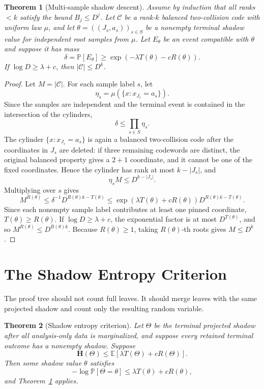 \documentclass[11pt]{article}
\newtheorem{theorem}{Theorem}[section]
\newcommand{\C}{\mathcal C}
\newcommand{\Prb}{\mathbb P}
\newcommand{\EE}{\mathbb E}
\newcommand{\bfH}{\mathbf H}
\begin{document}
\begin{theorem}[Multi-sample shadow descent]
\label{thm:multi-shadow}
Assume by induction that all ranks $<k$ satisfy the bound $B_j\le D^j$.
Let $\C$ be a rank-$k$ balanced two-collision code with uniform law $\mu$, and
let $\theta=((J_s,a_s))_{s\in S}$ be a nonempty terminal shadow value for
independent root samples from $\mu$.  Let $E_\theta$ be an event compatible with
$\theta$ and suppose it has mass
\[
  \delta=\Prb[E_\theta]
  \ge \exp(-\lambda T(\theta)-cR(\theta)).
\]
If $\log D\ge \lambda+c$, then $|\C|\le D^k$.
\end{theorem}

\begin{proof}
Let $M=|\C|$.  For each sample label $s$, let
\[
  \eta_s=\mu(\{x:x_{J_s}=a_s\}).
\]
Since the samples are independent and the terminal event is contained in the
intersection of the cylinders,
\[
  \delta\le \prod_{s\in S}\eta_s.
\]
The cylinder $\{x:x_{J_s}=a_s\}$ is again a balanced two-collision code after
the coordinates in $J_s$ are deleted: if three remaining codewords are
distinct, the original balanced property gives a $2+1$ coordinate, and it
cannot be one of the fixed coordinates.  Hence the cylinder has rank at most
$k-|J_s|$, and
\[
  \eta_s M\le D^{k-|J_s|}.
\]
Multiplying over $s$ gives
\[
  M^{R(\theta)}
  \le \delta^{-1}D^{R(\theta)k-T(\theta)}
  \le \exp(\lambda T(\theta)+cR(\theta))
     D^{R(\theta)k-T(\theta)}.
\]
Since each nonempty sample label contributes at least one pinned coordinate,
$T(\theta)\ge R(\theta)$.  If $\log D\ge\lambda+c$, the exponential factor is
at most $D^{T(\theta)}$, and so $M^{R(\theta)}\le D^{R(\theta)k}$.
Because $R(\theta)\ge1$, taking $R(\theta)$-th roots gives $M\le D^k$.
\end{proof}

\section{The Shadow Entropy Criterion}

The proof tree should not count full leaves.  It should merge leaves with the
same projected shadow and count only the resulting random variable.

\begin{theorem}[Shadow entropy criterion]
\label{thm:shadow-entropy}
Let $\Theta$ be the terminal projected shadow after all analysis-only data is
marginalized, and suppose every retained terminal outcome has a nonempty
shadow.  Suppose
\[
  \bfH(\Theta)
  \le
  \EE[\lambda T(\Theta)+cR(\Theta)].
\]
Then some shadow value $\theta$ satisfies
\[
  -\log \Prb[\Theta=\theta]
  \le
  \lambda T(\theta)+cR(\theta),
\]
and Theorem~\ref{thm:multi-shadow} applies.
\end{theorem}
\end{document}
